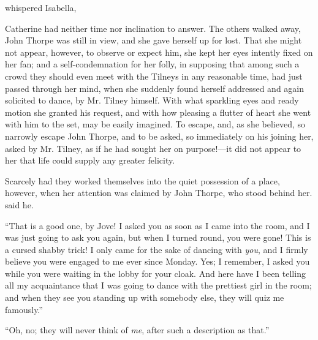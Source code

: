  whispered Isabella, 

Catherine had neither time nor inclination to answer. The others walked away, John Thorpe was still in view, and she gave herself up for lost. That she might not appear, however, to observe or expect him, she kept her eyes intently fixed on her fan; and a self-condemnation for her folly, in supposing that among such a crowd they should even meet with the Tilneys in any reasonable time, had just passed through her mind, when she suddenly found herself addressed and again solicited to dance, by Mr. Tilney himself. With what sparkling eyes and ready motion she granted his request, and with how pleasing a flutter of heart she went with him to the set, may be easily imagined. To escape, and, as she believed, so narrowly escape John Thorpe, and to be asked, so immediately on his joining her, asked by Mr. Tilney, as if he had sought her on purpose!---it did not appear to her that life could supply any greater felicity.

Scarcely had they worked themselves into the quiet possession of a place, however, when her attention was claimed by John Thorpe, who stood behind her.  said he. 


“That is a good one, by Jove! I asked you as soon as I came into the room, and I was just going to ask you again, but when I turned round, you were gone! This is a cursed shabby trick! I only came for the sake of dancing with {\em you}, and I firmly believe you were engaged to me ever since Monday. Yes; I remember, I asked you while you were waiting in the lobby for your cloak. And here have I been telling all my acquaintance that I was going to dance with the prettiest girl in the room; and when they see you standing up with somebody else, they will quiz me famously.”

“Oh, no; they will never think of {\em me}, after such a description as that.”

